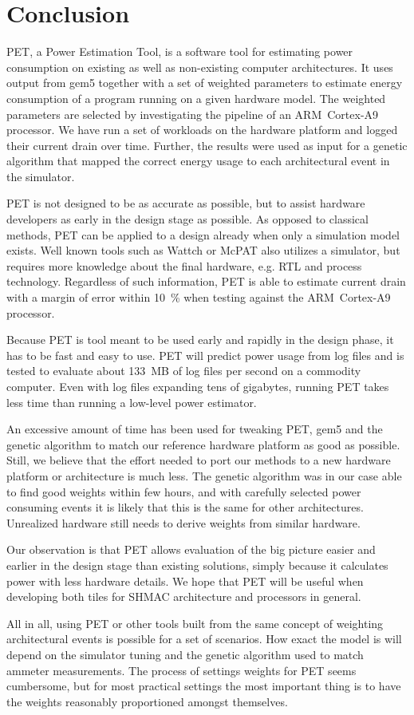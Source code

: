 \section{Conclusion}

PET, a Power Estimation Tool, is a software tool for estimating power
consumption on existing as well as non-existing computer architectures. It uses
output from gem5 together with a set of weighted parameters to estimate energy
consumption of a program running on a given hardware model. The weighted
parameters are selected by investigating the pipeline of an ARM~Cortex-A9
processor. We have run a set of workloads on the hardware platform and logged
their current drain over time. Further, the results were used as input for a
genetic algorithm that mapped the correct energy usage to each architectural
event in the simulator.

PET is not designed to be as accurate as possible, but to assist hardware
developers as early in the design stage as possible. As opposed to classical
methods, PET can be applied to a design already when only a simulation model
exists. Well known tools such as Wattch \cite{brooks2000wattch} or McPAT
\cite{li2009mcpat} also utilizes a simulator, but requires more knowledge about
the final hardware, e.g. RTL and process technology. Regardless of such
information, PET is able to estimate current drain with a margin of error within
10~\% when testing against the ARM~Cortex-A9 processor.

Because PET is tool meant to be used early and rapidly in the design phase, it
has to be fast and easy to use. PET will predict power usage from log files and
is tested to evaluate about 133~MB of log files per second on a commodity
computer. Even with log files expanding tens of gigabytes, running PET takes
less time than running a low-level power estimator.

An excessive amount of time has been used for tweaking PET, gem5 and the genetic
algorithm to match our reference hardware platform as good as possible. Still,
we believe that the effort needed to port our methods to a new hardware platform
or architecture is much less. The genetic algorithm was in our case able to find
good weights within few hours, and with carefully selected power consuming
events it is likely that this is the same for other architectures. Unrealized
hardware still needs to derive weights from similar hardware.

Our observation is that PET allows evaluation of the big picture easier and
earlier in the design stage than existing solutions, simply because it
calculates power with less hardware details. We hope that PET will be useful
when developing both tiles for SHMAC architecture and processors in general.

All in all, using PET or other tools built from the same concept of weighting
architectural events is possible for a set of scenarios. How exact the model is
will depend on the simulator tuning and the genetic algorithm used to match
ammeter measurements. The process of settings weights for PET seems cumbersome,
but for most practical settings the most important thing is to have the weights
reasonably proportioned amongst themselves.
